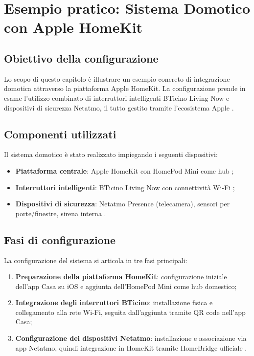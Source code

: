 \chapter{Esempio pratico: Sistema Domotico con Apple HomeKit}
\section{Obiettivo della configurazione}
Lo scopo di questo capitolo è illustrare un esempio concreto di integrazione domotica attraverso la piattaforma Apple HomeKit. La configurazione prende in esame l'utilizzo combinato di interruttori intelligenti BTicino Living Now e dispositivi di sicurezza Netatmo, il tutto gestito tramite l'ecosistema Apple \parencite{appleHomekit}.

\section{Componenti utilizzati}
Il sistema domotico è stato realizzato impiegando i seguenti dispositivi:
\begin{itemize}
    \item \textbf{Piattaforma centrale}: Apple HomeKit con HomePod Mini come hub \parencite{appleHomepod};
    \item \textbf{Interruttori intelligenti}: BTicino Living Now con connettività Wi-Fi \parencite{bticino};
    \item \textbf{Dispositivi di sicurezza}: Netatmo Presence (telecamera), sensori per porte/finestre, sirena interna \parencite{netatmo}.
\end{itemize}

\section{Fasi di configurazione}
La configurazione del sistema si articola in tre fasi principali:
\begin{enumerate}
    \item \textbf{Preparazione della piattaforma HomeKit}: configurazione iniziale dell'app Casa su iOS e aggiunta dell'HomePod Mini come hub domestico;
    \item \textbf{Integrazione degli interruttori BTicino}: installazione fisica e collegamento alla rete Wi-Fi, seguita dall'aggiunta tramite QR code nell'app Casa;
    \item \textbf{Configurazione dei dispositivi Netatmo}: installazione e associazione via app Netatmo, quindi integrazione in HomeKit tramite HomeBridge ufficiale \parencite{homebridge}.
\end{enumerate}

